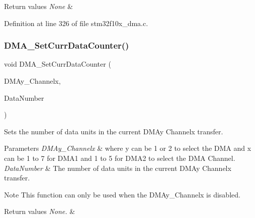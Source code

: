 \begin{DoxyRetVals}{Return values}
{\em None} & \\
\hline
\end{DoxyRetVals}


Definition at line 326 of file stm32f10x\+\_\+dma.\+c.

\mbox{\label{group___d_m_a___private___functions_gade5d9e532814eaa46514cb385fdff709}} 
\subsubsection{\texorpdfstring{D\+M\+A\+\_\+\+Set\+Curr\+Data\+Counter()}{DMA\_SetCurrDataCounter()}}
{\footnotesize\ttfamily void D\+M\+A\+\_\+\+Set\+Curr\+Data\+Counter (\begin{DoxyParamCaption}\item[{\hyperlink{struct_d_m_a___channel___type_def}{D\+M\+A\+\_\+\+Channel\+\_\+\+Type\+Def} $\ast$}]{D\+M\+Ay\+\_\+\+Channelx,  }\item[{uint16\+\_\+t}]{Data\+Number }\end{DoxyParamCaption})}



Sets the number of data units in the current D\+M\+Ay Channelx transfer. 


\begin{DoxyParams}{Parameters}
{\em D\+M\+Ay\+\_\+\+Channelx} & where y can be 1 or 2 to select the D\+MA and x can be 1 to 7 for D\+M\+A1 and 1 to 5 for D\+M\+A2 to select the D\+MA Channel. \\
\hline
{\em Data\+Number} & The number of data units in the current D\+M\+Ay Channelx transfer. \\
\hline
\end{DoxyParams}
\begin{DoxyNote}{Note}
This function can only be used when the D\+M\+Ay\+\_\+\+Channelx is disabled. 
\end{DoxyNote}

\begin{DoxyRetVals}{Return values}
{\em None.} & \\
\hline
\end{DoxyRetVals}


